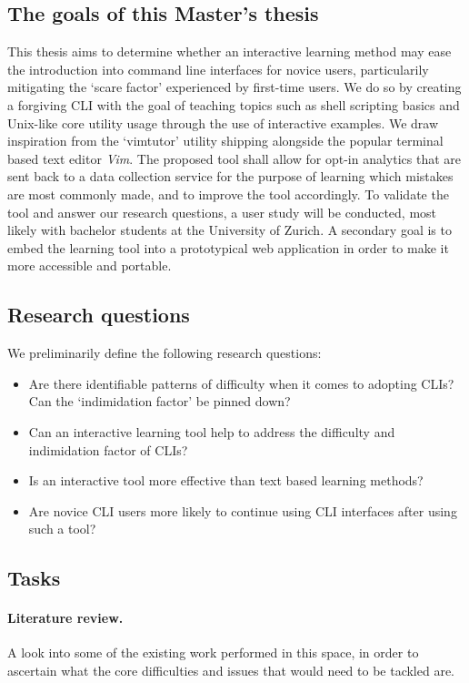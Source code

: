 \documentclass{task_description}
\begin{document}
\subsection*{The goals of this Master's thesis}
This thesis aims to determine whether an interactive learning method may ease
the introduction into command line interfaces for novice users, particularily
mitigating the `scare factor' experienced by first-time users. We do so by
creating a forgiving CLI with the goal of teaching topics such as shell
scripting basics and Unix-like core utility usage through the use of
interactive examples. We draw inspiration from the `vimtutor'
\cite{pierce_ware_smith_moolenaar_2019} utility shipping alongside the popular
terminal based text editor \emph{Vim}. The proposed tool shall allow for opt-in
analytics that are sent back to a data collection service for the purpose of
learning which mistakes are most commonly made, and to improve the tool
accordingly. To validate the tool and answer our research questions,
a user study will be conducted, most likely
with bachelor students at the University of Zurich. A secondary goal is to
embed the learning tool into a prototypical web application in order
to make it more accessible and portable.

\subsection*{Research questions}
We preliminarily define the following research questions:

\begin{itemize}
    \item Are there identifiable patterns of difficulty when it
        comes to adopting CLIs? Can the `indimidation factor' be pinned down?
    \item Can an interactive learning tool help to address the difficulty and
        indimidation factor of CLIs?
    \item Is an interactive tool more effective than text based learning
        methods?
    \item Are novice CLI users more likely to continue
        using CLI interfaces after using such a tool?
\end{itemize}

\subsection*{Tasks}

\paragraph{Literature review.} A look into some of the existing work performed in
this space, in order to ascertain what the core difficulties and issues that
would need to be tackled are. 
\end{document}

